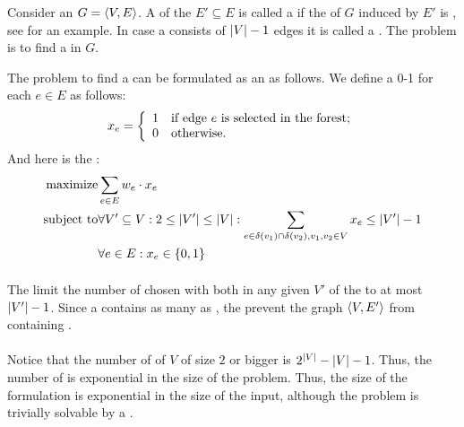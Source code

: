 \begin{definition}
Consider an  $G=\left\langle V,E \right\rangle$. A  of the  $E'\subseteq E$ is called a  if the  of $G$ induced by $E'$ is , see  for an example. In case a  consists of $\left| V \right|-1$ edges it is called a . The problem is to find a  in $G$.
\end{definition}

The problem to find a  can be formulated as an  as follows. We define a 0-1  for each  $e\in E$ as follows:
\begin{equation}
x_e=\left\{\begin{array}{ll} 1&\mbox{if edge $e$ is selected in the forest;}\\0&\mbox{otherwise.} \end{array}\right.
\end{equation}
And here is the :
\begin{eqnarray}
\mbox{maximize}&\sumdomain[e]{E}{w_e\cdot x_e}\eqnlab{forest-m}\\
\mbox{subject to}&\forall V'\subseteq V:2\leq\abs{V'}\leq\abs{V}:\sumdomain[e]{\fun{\delta}{v_1}\cap\fun{\delta}{v_2},v_1,v_2\in V}{x_e}\leq\abs{V'}-1\eqnlab{forest-c1}\\
&\forall e\in E:x_e\in\accl{0,1}\eqnlab{forest-c2}
\end{eqnarray}

\paragraph{}The  limit the number of chosen  with both  in any given  $V'$ of the  to at most $\left| V' \right|-1$. Since a  contains as many  as , the  prevent the graph $\left\langle V,E' \right\rangle$ from containing .
\paragraph{}
Notice that the number of  of $V$ of size $2$ or bigger is $2^{\left| V \right|}-\left| V \right|-1$. Thus, the number of  is exponential in the size of the problem. Thus, the size of the formulation is exponential in the size of the input, although the problem is trivially solvable by a .
